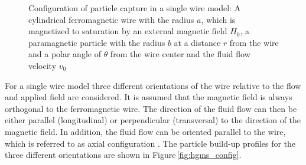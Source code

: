 \begin{figure}[h]
\centering
{}
\caption[Configuration of particle capture in a single wire model]{Configuration of particle capture in a single wire model: A cylindrical ferromagnetic wire with the radius $a$, which is magnetized to saturation by an external magnetic field $H_{0}$, a paramagnetic particle with the radius $b$ at a distance $r$ from the wire and a polar angle of $\theta$ from the wire center and the fluid flow velocity $v_{0}$ \cite{svoboda2004magnetic}
\label{fig:wire}
}
\end{figure}

For a single wire model three different orientations of the wire relative to the flow and applied field are considered. It is assumed that the magnetic field is always orthogonal to the ferromagnetic wire. The direction of the fluid flow can then be either parallel (longitudinal) or perpendicular (transversal) to the direction of the magnetic field. In addition, the fluid flow can be oriented parallel to the wire, which is referred to as axial configuration \cite{friedlaender1978particle}. The particle build-up profiles for the three different orientations are shown in Figure\,\ref{fig:hgms_config}.   

